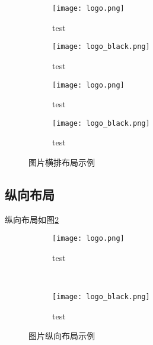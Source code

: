 \begin{figure}[!htb]
    \centering
    \begin{subfigure}[t]{0.24\linewidth}
        \captionsetup{justification=centering}
        \begin{minipage}[b]{1\linewidth}
        \texttt{[image: logo.png]}
        \caption{test}
        \end{minipage}
    \end{subfigure}
    \begin{subfigure}[t]{0.24\linewidth}
        \captionsetup{justification=centering}
        \begin{minipage}[b]{1\linewidth}
        \texttt{[image: logo\_black.png]}
        \caption{test}
        \end{minipage}
    \end{subfigure}
    \begin{subfigure}[t]{0.24\linewidth}
        \captionsetup{justification=centering}
        \begin{minipage}[b]{1\linewidth}
        \texttt{[image: logo.png]}
        \caption{test}
        \end{minipage}
    \end{subfigure}
    \begin{subfigure}[t]{0.24\linewidth}
        \captionsetup{justification=centering}
        \begin{minipage}[b]{1\linewidth}
        \texttt{[image: logo\_black.png]}
        \caption{test}
        \end{minipage}
    \end{subfigure}
    \caption{图片横排布局示例}
    \label{f.row}
\end{figure}

\subsection{纵向布局}

纵向布局如图\ref{f.col}

\begin{figure}[!htb]
    \centering
    \begin{subfigure}[t]{0.15\linewidth}
        \captionsetup{justification=centering} %
        \begin{minipage}[b]{1\linewidth}
        \texttt{[image: logo.png]}
        \caption{test}
        \end{minipage}
    \end{subfigure}\\
    \begin{subfigure}[t]{0.15\linewidth}
        \captionsetup{justification=centering} %
        \begin{minipage}[b]{1\linewidth}
        \texttt{[image: logo\_black.png]}
        \caption{test}
        \end{minipage}
    \end{subfigure}
    \caption{图片纵向布局示例}
    \label{f.col}
\end{figure}

